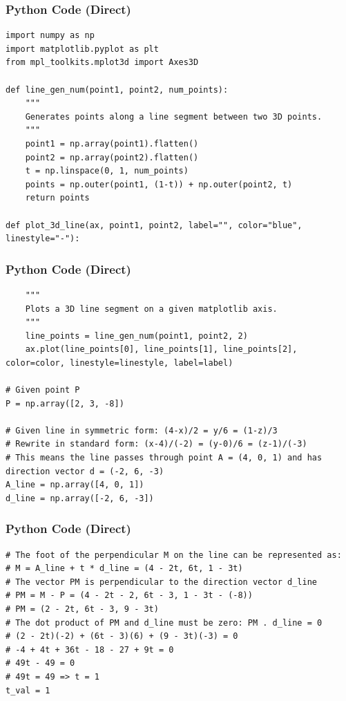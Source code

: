 \documentclass{beamer}
\begin{document}
\begin{frame}[fragile]
\frametitle{Python Code (Direct)}
\begin{lstlisting}
import numpy as np
import matplotlib.pyplot as plt
from mpl_toolkits.mplot3d import Axes3D

def line_gen_num(point1, point2, num_points):
    """
    Generates points along a line segment between two 3D points.
    """
    point1 = np.array(point1).flatten()
    point2 = np.array(point2).flatten()
    t = np.linspace(0, 1, num_points)
    points = np.outer(point1, (1-t)) + np.outer(point2, t)
    return points

def plot_3d_line(ax, point1, point2, label="", color="blue", linestyle="-"):
\end{lstlisting}
\end{frame}


\begin{frame}[fragile]
\frametitle{Python Code (Direct)}
\begin{lstlisting}
    """
    Plots a 3D line segment on a given matplotlib axis.
    """
    line_points = line_gen_num(point1, point2, 2)
    ax.plot(line_points[0], line_points[1], line_points[2], color=color, linestyle=linestyle, label=label)

# Given point P
P = np.array([2, 3, -8])

# Given line in symmetric form: (4-x)/2 = y/6 = (1-z)/3
# Rewrite in standard form: (x-4)/(-2) = (y-0)/6 = (z-1)/(-3)
# This means the line passes through point A = (4, 0, 1) and has direction vector d = (-2, 6, -3)
A_line = np.array([4, 0, 1])
d_line = np.array([-2, 6, -3])
\end{lstlisting}
\end{frame}


\begin{frame}[fragile]
\frametitle{Python Code (Direct)}
\begin{lstlisting}
# The foot of the perpendicular M on the line can be represented as:
# M = A_line + t * d_line = (4 - 2t, 6t, 1 - 3t)
# The vector PM is perpendicular to the direction vector d_line
# PM = M - P = (4 - 2t - 2, 6t - 3, 1 - 3t - (-8))
# PM = (2 - 2t, 6t - 3, 9 - 3t)
# The dot product of PM and d_line must be zero: PM . d_line = 0
# (2 - 2t)(-2) + (6t - 3)(6) + (9 - 3t)(-3) = 0
# -4 + 4t + 36t - 18 - 27 + 9t = 0
# 49t - 49 = 0
# 49t = 49 => t = 1
t_val = 1
\end{lstlisting}
\end{frame}
\end{document}
